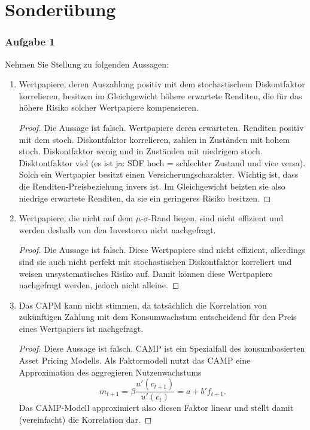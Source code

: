 \documentclass[12pt]{extreport} %
\theoremstyle{named}
\theoremstyle{nnamed}
\theoremstyle{itshape}
\theoremstyle{normal}
\begin{document}
\section*{Sonderübung}

\subsubsection*{Aufgabe 1}
Nehmen Sie Stellung zu folgenden Aussagen:
\begin{enumerate}
	\item Wertpapiere, deren Auszahlung positiv mit dem stochastischem Diskontfaktor  korrelieren, besitzen im Gleichgewicht höhere erwartete Renditen, die für das höhere Risiko solcher Wertpapiere kompensieren.
		\begin{proof}
			Die Aussage ist falsch. Wertpapiere deren erwarteten. Renditen positiv mit dem stoch. Diskontfaktor korrelieren, zahlen in Zuständen mit hohem stoch. Diskontfaktor wenig und in Zuständen mit niedrigem stoch. Disktontfaktor viel (es ist ja: SDF hoch = schlechter Zustand und vice versa). Solch ein Wertpapier besitzt einen Versicherungscharakter. Wichtig ist, dass die Renditen-Preisbeziehung invers ist. Im Gleichgewicht beizten sie also niedrige erwartete Renditen, da sie ein geringeres Risiko besitzen.
		\end{proof}
	\item Wertpapiere, die nicht auf dem $\mu$-$\sigma$-Rand liegen, sind nicht effizient und werden deshalb von den Investoren nicht nachgefragt.
		\begin{proof}
			Die Aussage ist falsch. Diese Wertpapiere sind nicht effizient, allerdings sind sie auch nicht perfekt mit stochastischen Diskontfaktor korreliert und weisen unsystematisches Risiko auf. Damit können diese Wertpapiere nachgefragt werden, jedoch nicht alleine.
		\end{proof}
	\item Das CAPM kann nicht stimmen, da tatsächlich die Korrelation von zukünftigen Zahlung mit dem Konsumwachstum entscheidend für den Preis eines Wertpapiers ist nachgefragt.
		\begin{proof}
			Diese Aussage ist falsch. CAMP ist ein Spezialfall des konsumbasierten Asset Pricing Modells. Als Faktormodell nutzt das CAMP eine Approximation des aggregieren Nutzenwachstums
			$$ m_{t+1} = \beta \frac{u'(c_{t+1})}{u'(c_{t})} = a + b' f_{t+1}. $$ 
			Das CAMP-Modell approximiert also diesen Faktor linear und  stellt damit (vereinfacht) die Korrelation dar.
		\end{proof}

\end{enumerate}
\end{document}
